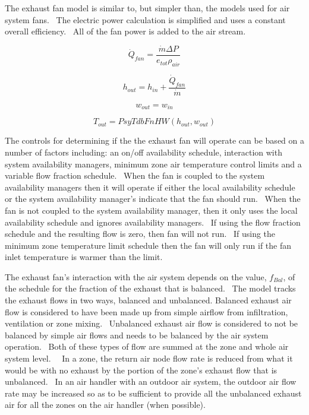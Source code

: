 The exhaust fan model is similar to, but simpler than, the models used for air system fans.~ The electric power calculation is simplified and uses a constant overall efficiency.~ All of the fan power is added to the air stream.

\begin{equation}
{\dot Q_{fan}} = \frac{\dot m \Delta P}{e_{tot} \rho_{air}}
\end{equation}

\begin{equation}
{h_{out}} = {h_{in}} + \frac{{{{\dot Q}_{fan}}}}{{\dot m}}
\end{equation}

\begin{equation}
{w_{out}} = {w_{in}}
\end{equation}

\begin{equation}
{T_{out}} = PsyTdbFnHW\left( {{h_{out}},{w_{out}}} \right)
\end{equation}

The controls for determining if the the exhaust fan will operate can be based on a number of factors including: an on/off availability schedule, interaction with system availability managers, minimum zone air temperature control limits and a variable flow fraction schedule.~ When the fan is coupled to the system availability managers then it will operate if either the local availability schedule or the system availability manager's indicate that the fan should run.~ When the fan is not coupled to the system availability manager, then it only uses the local availability schedule and ignores availability managers.~ If using the flow fraction schedule and the resulting flow is zero, then fan will not run.~ If using the minimum zone temperature limit schedule then the fan will only run if the fan inlet temperature is warmer than the limit.

The exhaust fan's interaction with the air system depends on the value, \({f_{Bal}}\), of the schedule for the fraction of the exhaust that is balanced.~ The model tracks the exhaust flows in two ways, balanced and unbalanced. Balanced exhaust air flow is considered to have been made up from simple airflow from infiltration, ventilation or zone mixing.~ Unbalanced exhaust air flow is considered to not be balanced by simple air flows and needs to be balanced by the air system operation.~ Both of these types of flow are summed at the zone and whole air system level.~~ In a zone, the return air node flow rate is reduced from what it would be with no exhaust by the portion of the zone's exhaust flow that is unbalanced.~ In an air handler with an outdoor air system, the outdoor air flow rate may be increased so as to be sufficient to provide all the unbalanced exhaust air for all the zones on the air handler (when possible).
